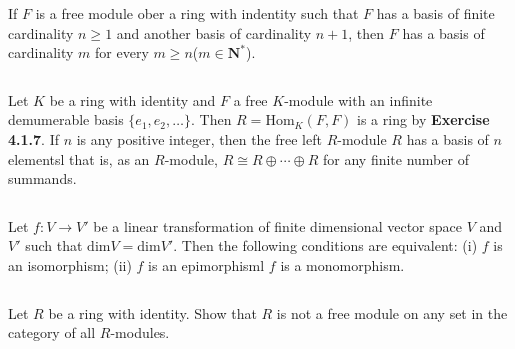 $$ $$

\begin{ex}
    If $F$ is a free module ober a ring with indentity such that $F$ has a basis of finite cardinality $n\geq 1$ and another basis of cardinality $n+1$, then $F$ has a basis of cardinality $m$ for every $m\geq n$($m\in \mathbf{N}^{*}$).
\end{ex}

$$ $$

\begin{ex}
    Let $K$ be a ring with identity and $F$ a free $K$-module with an infinite demumerable basis $\{e_{1},e_{2},\dots\}$. Then $R=\mathrm{Hom}_{K}(F,F)$ is a ring by \textbf{Exercise 4.1.7}. If $n$ is any positive integer, then the free left $R$-module $R$ has a basis of $n$ elementsl that is,  as an $R$-module, $R\cong R\oplus\cdots\oplus R$ for any finite number of summands.
\end{ex}

$$ $$

\begin{ex}
    Let $f:V\to V'$ be a linear transformation of finite dimensional vector space $V$ and $V'$ such that $\mathrm{dim}V=\mathrm{dim}V'$. Then the following conditions are equivalent: (i) $f$ is an isomorphism; (ii) $f$ is an epimorphisml $f$ is a monomorphism.
\end{ex}

$$ $$

\begin{ex}
    Let $R$ be a ring with identity. Show that $R$ is not a free module on any set in the category of all $R$-modules.
\end{ex}